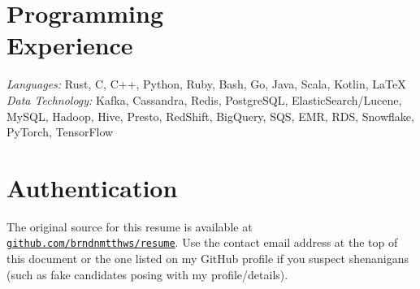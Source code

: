 \documentclass[margin,line]{resume}
\begin{document}
\begin{resume}
\vspace{3mm}

\section{\mysidestyle Programming\\Experience}

\emph{Languages:} Rust, C, C++, Python, Ruby, Bash, Go, Java, Scala, Kotlin, \LaTeX \\
\emph{Data Technology:} Kafka, Cassandra, Redis, PostgreSQL, ElasticSearch/Lucene, MySQL, Hadoop, Hive, Presto, RedShift, BigQuery, SQS, EMR, RDS, Snowflake, PyTorch, TensorFlow

\section{\mysidestyle Authentication}

The original source for this resume is available at
\href{https://github.com/brndnmtthws/resume}{\texttt{github.com/brndnmtthws/resume}}.
Use the contact email address at the top of this document or the one listed
on my GitHub profile if you suspect shenanigans (such as fake candidates
posing with my profile/details).
\end{resume}
\end{document}

